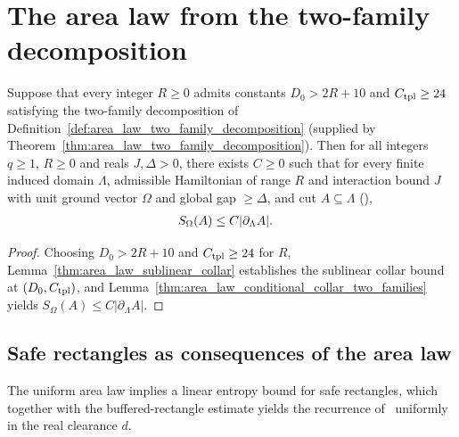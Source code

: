 \section{The area law from the two-family decomposition}
\label{sec:area_law_from_two_families}

\begin{theorem}
    \label{thm:area_law_conditional_two_families}
    \leanok
    Suppose that every integer $R\ge0$ admits constants $D_0>2R+10$ and $C_{\rm tpl}\ge24$ satisfying the two-family decomposition of Definition~\ref{def:area_law_two_family_decomposition} (supplied by Theorem~\ref{thm:area_law_two_family_decomposition}).
    Then for all integers $q\ge1$, $R\ge0$ and reals $J,\Delta>0$, there exists $C\ge0$ such that for every finite induced domain $\Lambda$, admissible Hamiltonian of range $R$ and interaction bound $J$ with unit ground vector $\Omega$ and global gap $\ge\Delta$, and cut $A\subseteq\Lambda$ (\cite[Theorem~1.1, Section~11]{OpenAI2026AreaLaw}),
    \begin{align}
        S_\Omega(A) & \le C|\partial_\Lambda A|.\notag
    \end{align}
\end{theorem}
\begin{proof}
    \leanok
    Choosing $D_0>2R+10$ and $C_{\rm tpl}\ge24$ for $R$, Lemma~\ref{thm:area_law_sublinear_collar} establishes the sublinear collar bound at $(D_0,C_{\rm tpl})$, and Lemma~\ref{thm:area_law_conditional_collar_two_families} yields $S_\Omega(A)\le C|\partial_\Lambda A|$.
\end{proof}

\subsection{Safe rectangles as consequences of the area law}

The uniform area law implies a linear entropy bound for safe rectangles, which together with the buffered-rectangle estimate yields the recurrence of~\cite[Proposition~3.3]{OpenAI2026AreaLaw} uniformly in the real clearance $d$.


